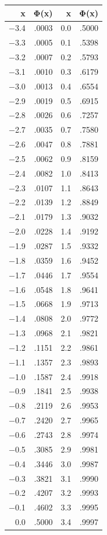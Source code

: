{\def\LTcaptype{none} %
\begin{longtable}[]{@{}rrrr@{}}
\toprule\noalign{}
x & Φ(x) & x & Φ(x) \\
\midrule\noalign{}
\endhead
\bottomrule\noalign{}
\endlastfoot
−3.4 & .0003 & 0.0 & .5000 \\
−3.3 & .0005 & 0.1 & .5398 \\
−3.2 & .0007 & 0.2 & .5793 \\
−3.1 & .0010 & 0.3 & .6179 \\
−3.0 & .0013 & 0.4 & .6554 \\
−2.9 & .0019 & 0.5 & .6915 \\
−2.8 & .0026 & 0.6 & .7257 \\
−2.7 & .0035 & 0.7 & .7580 \\
−2.6 & .0047 & 0.8 & .7881 \\
−2.5 & .0062 & 0.9 & .8159 \\
−2.4 & .0082 & 1.0 & .8413 \\
−2.3 & .0107 & 1.1 & .8643 \\
−2.2 & .0139 & 1.2 & .8849 \\
−2.1 & .0179 & 1.3 & .9032 \\
−2.0 & .0228 & 1.4 & .9192 \\
−1.9 & .0287 & 1.5 & .9332 \\
−1.8 & .0359 & 1.6 & .9452 \\
−1.7 & .0446 & 1.7 & .9554 \\
−1.6 & .0548 & 1.8 & .9641 \\
−1.5 & .0668 & 1.9 & .9713 \\
−1.4 & .0808 & 2.0 & .9772 \\
−1.3 & .0968 & 2.1 & .9821 \\
−1.2 & .1151 & 2.2 & .9861 \\
−1.1 & .1357 & 2.3 & .9893 \\
−1.0 & .1587 & 2.4 & .9918 \\
−0.9 & .1841 & 2.5 & .9938 \\
−0.8 & .2119 & 2.6 & .9953 \\
−0.7 & .2420 & 2.7 & .9965 \\
−0.6 & .2743 & 2.8 & .9974 \\
−0.5 & .3085 & 2.9 & .9981 \\
−0.4 & .3446 & 3.0 & .9987 \\
−0.3 & .3821 & 3.1 & .9990 \\
−0.2 & .4207 & 3.2 & .9993 \\
−0.1 & .4602 & 3.3 & .9995 \\
0.0 & .5000 & 3.4 & .9997 \\
\end{longtable}
}

